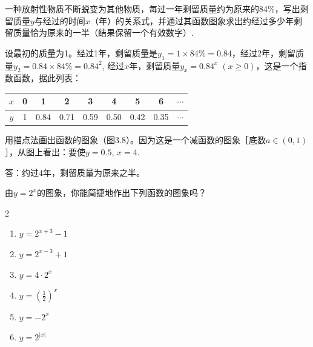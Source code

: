  \begin{example}
     一种放射性物质不断蜕变为其他物质，每过一年剩留质量约为原来的84\%，写出剩留质量$y$与经过的时间$x$（年）的关系式，并通过其函数图象求出约经过多少年剩留质量恰为原来的一半（结果保留一个有效数字）.
 \end{example}
 
 \begin{solution}
    设最初的质量为1。经过1年，剩留质量是$y_1=1\times 84\%=0.84$，经过2年，剩留质量$y_2=0.84\times 84\%=0.84^2$, 经过$x$年，剩留质量$y_x=0.84^x\; (x\ge 0)$，这是一个指数函数，据此列表：
 \begin{center}
     \begin{tabular}{ccccccccc}
 \hline
 $x$&0&1&2&3&4&5&6&$\cdots$\\
 \hline
 $y$&1&0.84&0.71&0.59&0.50&0.42&0.35&$\cdots$ \\
 \hline
     \end{tabular}
 \end{center}
 用描点法画出函数的图象（图3.8）。因为这是一个减函数的图象［底数$a\in(0,1)$］，从图上看出：要使$y=0.5$, $x=4$.
 \begin{figure}[htp]
     \centering
     \caption{}
 \end{figure}
 
 答：约过4年，剩留质量为原来之半。
 \end{solution}
 
 \begin{ex}
 由$y=2^x$的图象，你能简捷地作出下列函数的图象吗？
 \begin{multicols}{2}
 \begin{enumerate}[(1)]
     \item $y=2^{x+3}-1$
     \item $y=2^{x-3}+1$
     \item $y=4\cdot 2^x$
     \item $y=\left(\frac{1}{2}\right)^x$
     \item $y=-2^{x}$
     \item $y=2^{|x|}$
 \end{enumerate}
 \end{multicols}
 \end{ex}
 

